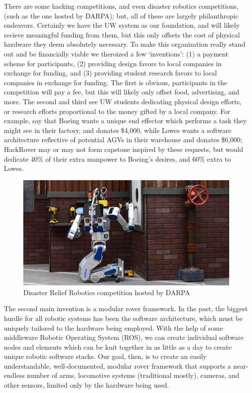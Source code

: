 \documentclass[a4paper, 10pt]{article}
\begin{document}
		There are some hacking competitions, and even disaster robotics competitions, (such as the one hosted by DARPA); but, all of these are largely philanthropic endeavors. Certainly we have the UW system as our foundation, and will likely recieve meaningful funding from them, but this only offsets the cost of physical hardware they deem absolutely necessary. To make this organization really stand out and be financially viable we theroized a few `inventions': (1) a payment scheme for participants, (2) providing design favors to local companies in exchange for funding, and (3) providing student research favors to local companies in exchange for funding. The first is obvious, participants in the competition will pay a fee, but this will likely only offset food, advertising, and more. The second and third see UW students dedicating physical design efforts, or research efforts proportional to the money gifted by a local company. For example, say that Boeing wants a unique end effector which performs a task they might see in their factory, and donates \$4,000, while Lowes wants a software architecture reflective of potential AGVs in their warehouse and donates \$6,000; HackRover may or may not form capstone inspired by these requests, but would dedicate 40\% of their extra manpower to Boeing's desires, and 60\% extra to Lowes.
	
	 	\begin{figure} [!h]
			\centering
			\includegraphics[scale=2.25]{Photos/DARPA_competition}
			\caption{Disaster Relief Robotics competition hosted by DARPA}
			\label{DARPA_competition}
		\end{figure}

		The second main invention is a modular rover framework. In the past, the biggest hurdle for all robotic systems has been the software architecture, which must be uniquely tailored to the hardware being employed. With the help of some middleware Robotic Operating System (ROS), we can create individual software nodes and elements which can be knit together in as little as a day to create unique robotic software stacks. Our goal, then, is to create an easily understandable, well-documented, modular rover framework that supports a near-endless number of arms, locomotive systems (traditional mostly), cameras, and other sensors, limited only by the hardware being used.	
\end{document}
